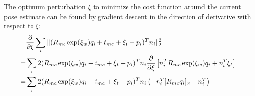 The optimum perturbation $\xi$ to minimize the cost function around the
current pose estimate can be found by gradient descent in the direction of derivative with
respect to $\xi$:
\begin{align}
  & \frac{\partial }{\partial \xi} \sum_i \| ( R_{mc} \exp(\xi_w) q_i + t_{mc} + \xi_t - p_i )^T n_i \|^2_2\\
  =&  \sum_i 2 ( R_{mc} \exp(\xi_w) q_i + t_{mc} + \xi_t - p_i )^T n_i  \frac{\partial }{\partial \xi}
  \left[ n_i^T R_{mc} \exp(\xi_w) q_i   + n_i^T \xi_t
  \right]\\
  =&  \sum_i 2 ( R_{mc} \exp(\xi_w) q_i + t_{mc} + \xi_t - p_i )^T n_i  
  \begin{pmatrix}
    - n_i^T [R_{mc} q_i]_\times  & n_i^T
  \end{pmatrix}
\end{align}
